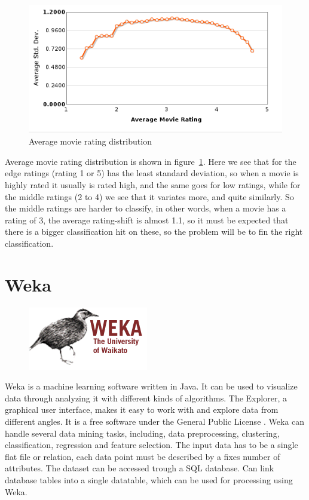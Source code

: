 \begin{figure}[H]
\includegraphics[width=5in]{image/avgmovierating.png}
\centering
\caption{Average movie rating distribution}
\label{figure:avgmovierating}
\end{figure}

Average movie rating distribution is shown in figure~\ref{figure:avgmovierating}. Here we see that for the edge ratings (rating 1 or 5) has the least standard deviation, so when a movie is highly rated it usually is rated high, and the same goes for low ratings, while for the middle ratings (2 to 4) we see that it variates more, and quite similarly. So the middle ratings are harder to classify, in other words, when a movie has a rating of 3, the average rating-shift is almost 1.1, so it must be expected that there is a bigger classification hit on these, so the problem will be to fin the right classification.








\section{Weka}

\begin{figure}
\vspace{-30pt}
\centering
\includegraphics[width = .25\textwidth]{image/Weka-logo.png}
\end{figure}


Weka is a machine learning software written in Java. It can be used to visualize data through analyzing it with different kinds of algorithms. The Explorer, a graphical user interface, makes it easy to work with and explore data from different angles. It is a free software under the General Public License \cite{GNU}. Weka can handle several data mining tasks, including, data preprocessing, clustering, classification, regression and feature selection. The input data has to be a single flat file or relation, each data point must be described by a fixes number of attributes. The dataset can be accessed trough a SQL database. Can link database tables into a single datatable, which can be used for processing using Weka.


